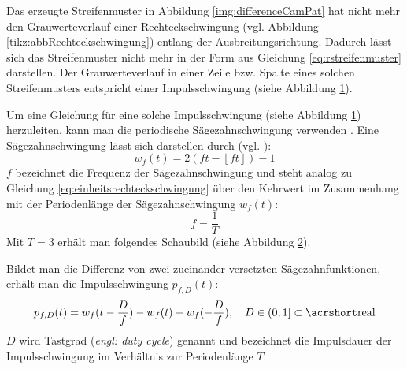 Das erzeugte Streifenmuster in Abbildung \ref{img:differenceCamPat} hat nicht mehr den Grauwerteverlauf einer Rechteckschwingung (vgl. Abbildung \ref{tikz:abbRechteckschwingung}) entlang der Ausbreitungsrichtung.
Dadurch lässt sich das Streifenmuster nicht mehr in der Form aus Gleichung \ref{eq:rstreifenmuster} darstellen.
Der Grauwerteverlauf in einer Zeile bzw. Spalte eines solchen Streifenmusters entspricht einer Impulsschwingung (siehe Abbildung \ref{tikz:abbPulsewave}).
%
{
	\begin{figure}[H]
		\centering
		
		\label{tikz:abbPulsewave}
	\end{figure}
}
%
\noindent
Um eine Gleichung für eine solche Impulsschwingung (siehe Abbildung \ref{tikz:abbPulsewave}) herzuleiten, kann man die periodische Sägezahnschwingung verwenden \cite{waveGeneration}.
Eine Sägezahnschwingung lässt sich darstellen durch (vgl. \cite{sawtoothWave}):
%
\begin{equation} \label{eq:saegezahnschwingung}
	w_f(t) = 2 \left( ft - \left\lfloor ft \right\rfloor \right) - 1
\end{equation}
%
\noindent
$f$ bezeichnet die Frequenz der Sägezahnschwingung und steht analog zu Gleichung \ref{eq:einheitsrechteckschwingung} über den Kehrwert im Zusammenhang mit der Periodenlänge der Sägezahnschwingung $w_f(t)$:
%
\begin{equation*}
	f = \dfrac{1}{T}
\end{equation*}
%
Mit $T = 3$ erhält man folgendes Schaubild (siehe Abbildung \ref{tikz:abbsaegezahnSchwingung}).
%
{
	\begin{figure}[H]
		\centering
		
		\label{tikz:abbsaegezahnSchwingung}
	\end{figure}
}
%
\noindent
Bildet man die Differenz von zwei zueinander versetzten Sägezahnfunktionen, erhält man die Impulsschwingung $p_{f,D}(t)$:
%
\begin{equation} \label{eq:pulsewave}
	p_{f,D}(t) = w_f(t - \dfrac{D}{f}) - w_f(t) - w_f(- \dfrac{D}{f}),
	\quad
	D \in \left(0,1\right] \subset \acrshortmath{real}
\end{equation}
%
\noindent
$D$ wird Tastgrad (\textit{engl: duty cycle}) genannt und bezeichnet die Impulsdauer der Impulsschwingung im Verhältnis zur Periodenlänge $T$.
